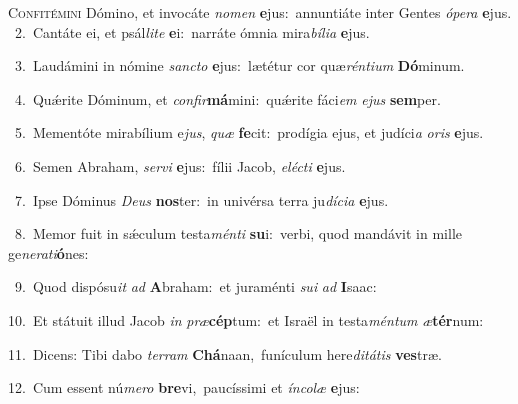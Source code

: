\lettrine{\initial\textcolor{\initialcolor}{C}}{onfitémini} Dómino, et invocáte \textit{no}\-\textit{men} \textbf{e}\-jus:~\star annuntiáte inter Gentes \textit{ó}\-\textit{pe}\textit{ra} \textbf{e}\-jus.\\
{\numbfont\textcolor{\numbcolor}{~2.}}~Cantáte ei, et psál\-\textit{li}\-\textit{te} \textbf{e}\-i:~\star narráte ómnia mira\-\textit{bí}\-\textit{li}\textit{a} \textbf{e}\-jus.\par
{\numbfont\textcolor{\numbcolor}{~3.}}~Laudámini in nómine \textit{sanc}\-\textit{to} \textbf{e}\-jus:~\star lætétur cor quæ\-\textit{rén}\-\textit{ti}\textit{um} \textbf{Dó}\-minum.\par
{\numbfont\textcolor{\numbcolor}{~4.}}~Quǽrite Dóminum, et \textit{con}\-\textit{fir}\textbf{má}mini:~\star quǽrite fáci\textit{em} \textit{e}\-\textit{jus} \textbf{sem}\-per.\par
{\numbfont\textcolor{\numbcolor}{~5.}}~Mementóte mirabílium e\-\textit{jus}\-, \textit{quæ} \textbf{fe}\-cit:~\star prodígia ejus, et judíci\textit{a} \textit{o}\-\textit{ris} \textbf{e}\-jus.\par
{\numbfont\textcolor{\numbcolor}{~6.}}~Semen Abraham, \textit{ser}\-\textit{vi} \textbf{e}\-jus:~\star fílii Jacob, \textit{e}\-\textit{léc}\textit{ti} \textbf{e}\-jus.\par
{\numbfont\textcolor{\numbcolor}{~7.}}~Ipse Dóminus \textit{De}\-\textit{us} \textbf{nos}\-ter:~\star in univérsa terra ju\-\textit{dí}\-\textit{ci}\textit{a} \textbf{e}\-jus.\par
{\numbfont\textcolor{\numbcolor}{~8.}}~Memor fuit in sǽculum testa\-\textit{mén}\-\textit{ti} \textbf{su}\-i:~\star verbi, quod mandávit in mille ge\-\textit{ne}\-\textit{ra}\textit{ti}\textbf{ó}nes:\par
{\numbfont\textcolor{\numbcolor}{~9.}}~Quod dispósu\textit{it} \textit{ad} \textbf{A}\-braham:~\star et juraménti \textit{su}\-\textit{i} \textit{ad} \textbf{I}\-saac:\par
{\numbfont\textcolor{\numbcolor}{10.}}~Et státuit illud Jacob \textit{in} \textit{præ}\-\textbf{cép}tum:~\star et Israël in testa\-\textit{mén}\-\textit{tum} \textit{æ}\-\textbf{tér}num:\par
{\numbfont\textcolor{\numbcolor}{11.}}~Dicens: Tibi dabo \textit{ter}\-\textit{ram} \textbf{Chá}\-naan,~\star funículum here\-\textit{di}\-\textit{tá}\textit{tis} \textbf{ves}\-træ.\par
{\numbfont\textcolor{\numbcolor}{12.}}~Cum essent nú\-\textit{me}\-\textit{ro} \textbf{bre}\-vi,~\star paucíssimi et \textit{ín}\-\textit{co}\textit{læ} \textbf{e}\-jus:\par
